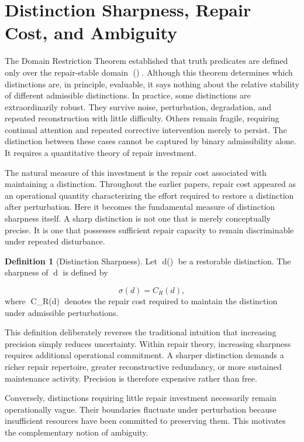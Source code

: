 \documentclass[12pt,oneside]{article}
\theoremstyle{plain}
\theoremstyle{definition}
\newtheorem{definition}[theorem]{Definition}
\theoremstyle{remark}
\DeclareMathOperator{\Rest}{Rest}
\begin{document}
\section{Distinction Sharpness, Repair Cost, and Ambiguity} 

The Domain Restriction Theorem established that truth predicates are defined only over the repair-stable domain \Rest(). Although this theorem determines which distinctions are, in principle, evaluable, it says nothing about the relative stability of different admissible distinctions. In practice, some distinctions are extraordinarily robust. They survive noise, perturbation, degradation, and repeated reconstruction with little difficulty. Others remain fragile, requiring continual attention and repeated corrective intervention merely to persist. The distinction between these cases cannot be captured by binary admissibility alone. It requires a quantitative theory of repair investment.

The natural measure of this investment is the repair cost associated with maintaining a distinction. Throughout the earlier papers, repair cost appeared as an operational quantity characterizing the effort required to restore a distinction after perturbation. Here it becomes the fundamental measure of distinction sharpness itself. A sharp distinction is not one that is merely conceptually precise. It is one that possesses sufficient repair capacity to remain discriminable under repeated disturbance.

\begin{definition}[Distinction Sharpness]
Let d\in\Rest() be a restorable distinction. The sharpness of d is defined by

\[
\sigma(d)=C_R(d),
\]
where C_R(d) denotes the repair cost required to maintain the distinction under admissible perturbations.
\end{definition}

This definition deliberately reverses the traditional intuition that increasing precision simply reduces uncertainty. Within repair theory, increasing sharpness requires additional operational commitment. A sharper distinction demands a richer repair repertoire, greater reconstructive redundancy, or more sustained maintenance activity. Precision is therefore expensive rather than free.

Conversely, distinctions requiring little repair investment necessarily remain operationally vague. Their boundaries fluctuate under perturbation because insufficient resources have been committed to preserving them. This motivates the complementary notion of ambiguity.
\end{document}
